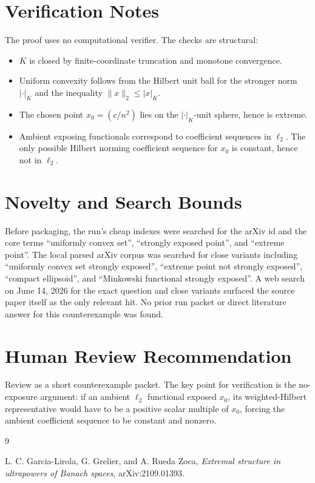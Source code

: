 \documentclass[11pt]{article}
\begin{document}
\section*{Verification Notes}

The proof uses no computational verifier. The checks are structural:
\begin{itemize}
  \item \(K\) is closed by finite-coordinate truncation and monotone
  convergence.
  \item Uniform convexity follows from the Hilbert unit ball for the stronger
  norm \(|\cdot|_K\) and the inequality \(\|x\|_2\le |x|_K\).
  \item The chosen point \(x_0=(c/n^2)\) lies on the \(|\cdot|_K\)-unit sphere,
  hence is extreme.
  \item Ambient exposing functionals correspond to coefficient sequences in
  \(\ell_2\). The only possible Hilbert norming coefficient sequence for
  \(x_0\) is constant, hence not in \(\ell_2\).
\end{itemize}

\section*{Novelty and Search Bounds}

Before packaging, the run's cheap indexes were searched for the arXiv id and
the core terms ``uniformly convex set'', ``strongly exposed point'', and
``extreme point''. The local parsed arXiv corpus was searched for close
variants including ``uniformly convex set strongly exposed'', ``extreme point
not strongly exposed'', ``compact ellipsoid'', and ``Minkowski functional
strongly exposed''. A web search on June 14, 2026 for the exact question and
close variants surfaced the source paper itself as the only relevant hit. No
prior run packet or direct literature answer for this counterexample was
found.

\section*{Human Review Recommendation}

Review as a short counterexample packet. The key point for verification is the
no-exposure argument: if an ambient \(\ell_2\) functional exposed \(x_0\), its
weighted-Hilbert representative would have to be a positive scalar multiple of
\(x_0\), forcing the ambient coefficient sequence to be constant and nonzero.

\begin{thebibliography}{9}

L. C. Garcia-Lirola, G. Grelier, and A. Rueda Zoca,
\emph{Extremal structure in ultrapowers of Banach spaces},
arXiv:2109.01393.

\end{thebibliography}
\end{document}

